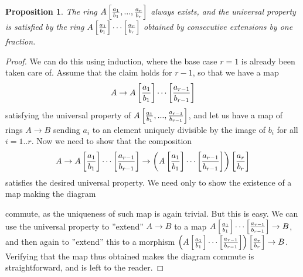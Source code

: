 \documentclass[12pt,a4paper,leqno]{article}
\theoremstyle{plain}
\newtheorem{prop}[theo]{Proposition}
\theoremstyle{definition}
\theoremstyle{remark}
\begin{document}
\begin{prop}\label{GeneratingOneAtATime}
The ring $A \left[ {a_1 \over b_1}, ... , {a_r \over b_r} \right]$ always exists, and the universal property is satisfied by the ring $A \left[ {a_1 \over b_1} \right] \cdots \left[ {a_r \over b_r} \right]$ obtained by consecutive extensions by one fraction.
\end{prop}
\begin{proof}
We can do this using induction, where the base case $r=1$ is already been taken care of. Assume that the claim holds for $r-1$, so that we have a map
\begin{equation*}
A \to A \left[ {a_1 \over b_1} \right] \cdots \left[ {a_{r-1} \over b_{r-1}} \right]
\end{equation*}
satisfying the universal property of $A \left[ {a_1 \over b_1}, ... ,{a_{r-1} \over b_{r-1}} \right]$, and let us have a map of rings $A \to B$ sending $a_i$ to an element uniquely divisible by the image of $b_i$ for all $i=1..r$. Now we need to show that the composition
\begin{equation*}
A \to A \left[ {a_1 \over b_1} \right] \cdots \left[ {a_{r-1} \over b_{r-1}} \right] \to \left( A \left[ {a_1 \over b_1} \right] \cdots \left[ {a_{r-1} \over b_{r-1}} \right] \right) \left[{a_{r} \over b_{r}} \right]
\end{equation*}
satisfies the desired universal property. We need only to show the existence of a map making the diagram
\begin{center}
\end{center}
commute, as the uniqueness of such map is again trivial. But this is easy. We can use the universal property to ''extend'' $A \to B$ to a map $A \left[ {a_1 \over b_1} \right] \cdots \left[ {a_{r-1} \over b_{r-1}} \right] \to B$, and then again to ''extend'' this to a morphism $\left( A \left[ {a_1 \over b_1} \right] \cdots \left[ {a_{r-1} \over b_{r-1}} \right] \right) \left[{a_{r} \over b_{r}} \right] \to B$. Verifying that the map thus obtained makes the diagram commute is straightforward, and is left to the reader.
\end{proof}
\end{document}
